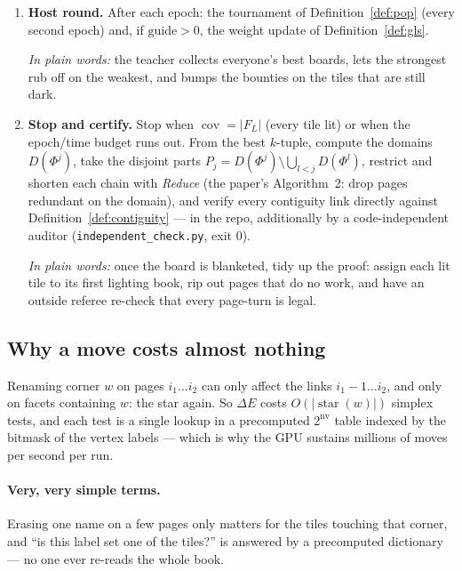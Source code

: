 \documentclass[11pt]{article}
\theoremstyle{definition}
\begin{document}
\begin{enumerate}[leftmargin=1.8em, itemsep=3pt]
  \item \textbf{Host round.} After each epoch: the tournament of
  Definition~\ref{def:pop} (every second epoch) and, if $\mathrm{guide} > 0$,
  the weight update of Definition~\ref{def:gls}.

  \emph{In plain words:} the teacher collects everyone's best boards, lets
  the strongest rub off on the weakest, and bumps the bounties on the tiles
  that are still dark.

  \item \textbf{Stop and certify.} Stop when $\operatorname{cov} = |F_L|$
  (every tile lit) or when the epoch/time budget runs out. From the best
  $k$-tuple, compute the domains $D(\Phi^j)$, take the disjoint parts
  $P_j = D(\Phi^j) \setminus \bigcup_{l < j} D(\Phi^l)$, restrict and shorten
  each chain with \emph{Reduce} (the paper's Algorithm~2: drop pages
  redundant on the domain), and verify every contiguity link directly
  against Definition~\ref{def:contiguity} --- in the repo, additionally by a
  code-independent auditor (\texttt{independent\_check.py}, exit 0).

  \emph{In plain words:} once the board is blanketed, tidy up the proof:
  assign each lit tile to its first lighting book, rip out pages that do no
  work, and have an outside referee re-check that every page-turn is legal.
\end{enumerate}

\subsection{Why a move costs almost nothing}

Renaming corner $w$ on pages $i_1 \dots i_2$ can only affect the links
$i_1 - 1 \dots i_2$, and only on facets containing $w$: the star again. So
$\Delta E$ costs $O(|\operatorname{star}(w)|)$ simplex tests, and each test
is a single lookup in a precomputed $2^{\mathrm{nv}}$ table indexed by the
bitmask of the vertex labels --- which is why the GPU sustains millions of
moves per second per run.

\paragraph{Very, very simple terms.}
Erasing one name on a few pages only matters for the tiles touching that
corner, and ``is this label set one of the tiles?'' is answered by a
precomputed dictionary --- no one ever re-reads the whole book.
\end{document}
